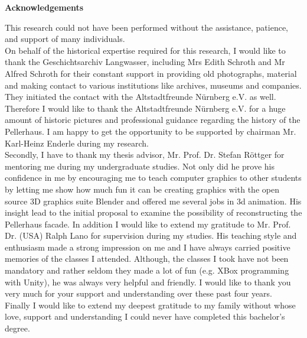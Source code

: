 \thispagestyle{plain}
\begin{center}
	
	\LARGE
	\textbf{Acknowledgements}
	
\end{center}
\vspace{100pt}

This research could not have been performed without the assistance, patience, and support of many individuals.\\

On behalf of the historical expertise required for this research, I would like to thank the Geschichtsarchiv Langwasser, including Mrs Edith Schroth and Mr Alfred Schroth for their constant support in providing old photographs, material and making contact to various institutions like archives, museums and companies. They initiated the contact with the Altstadtfreunde Nürnberg e.V. as well.\\
Therefore I would like to thank the Altstadtfreunde Nürnberg e.V. for a huge amount of historic pictures and professional guidance regarding the history of the Pellerhaus. I am happy to get the opportunity to be supported by chairman Mr. Karl-Heinz Enderle during my research.\\

Secondly, I have to thank my thesis advisor, Mr. Prof. Dr. Stefan Röttger for mentoring me during my undergraduate studies. Not only did he prove his confidence in me by encouraging me to teach computer graphics to other students by letting me show how much fun it can be creating graphics with the open source 3D graphics suite Blender and offered me several jobs in 3d animation. His insight lead to the initial proposal to examine the possibility of reconstructing the Pellerhaus facade. In addition I would like to extend my gratitude to Mr. Prof. Dr. (USA) Ralph Lano for supervision during my studies. His teaching style and enthusiasm made a strong impression on me and I have always carried positive memories of the classes I attended. Although, the classes I took have not been mandatory and rather seldom they made a lot of fun (e.g. XBox programming with Unity), he was always very helpful and friendly. I would like to thank you very much for your support and understanding over these past four years.\\

Finally I would like to extend my deepest gratitude to my family without whose love, support and understanding I could never have completed this bachelor's degree.
